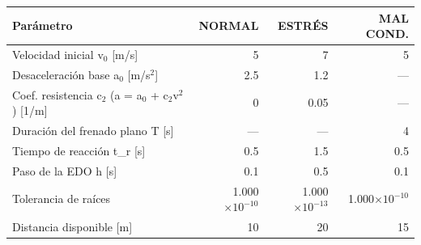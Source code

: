 {\footnotesize
\begin{longtable}{lrrr}
\toprule
\textbf{Parámetro} & \textbf{NORMAL} & \textbf{ESTRÉS} & \textbf{MAL COND.} \\
\midrule
\endhead
Velocidad inicial v$_{0}$ [m/s] & 5 & 7 & 5 \\
Desaceleración base a$_{0}$ [m/s$^{2}$] & 2.5 & 1.2 & — \\
Coef. resistencia c$_{2}$ (a = a$_{0}$ + c$_{2}$v$^{2}$) [1/m] & 0 & 0.05 & — \\
Duración del frenado plano T [s] & — & — & 4 \\
Tiempo de reacción t\_r [s] & 0.5 & 1.5 & 0.5 \\
Paso de la EDO h [s] & 0.1 & 0.5 & 0.1 \\
Tolerancia de raíces & 1.000$\times10^{-10}$ & 1.000$\times10^{-13}$ & 1.000$\times10^{-10}$ \\
Distancia disponible [m] & 10 & 20 & 15 \\
\bottomrule
\end{longtable}
}
